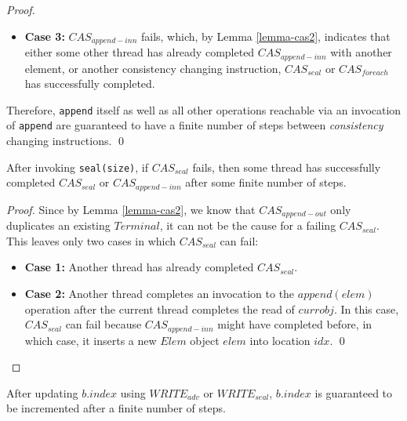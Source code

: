 \documentclass[runningheads,a4paper]{llncs}
\begin{document}
\begin{proof}
\begin{itemize}
\item \textbf{Case 3:} $CAS_{append-inn}$ fails, which, by Lemma 
\ref{lemma-cas2}, indicates that either some other thread has already completed 
$CAS_{append-inn}$ with another element, or another consistency changing
instruction, $CAS_{seal}$ or $CAS_{foreach}$ has successfully completed.

\end{itemize}

Therefore, \verb=append= itself as well as all other operations reachable via an
invocation of \verb=append= are guaranteed to have a finite number of steps between
\textit{consistency} changing instructions.
\qed
\end{proof}



\begin{lemma}\label{lemma-cas5}
After invoking \verb=seal(size)=, if $CAS_{seal}$ fails, then some thread has
successfully completed $CAS_{seal}$ or $CAS_{append-inn}$ after some finite number of steps.
\end{lemma}

\begin{proof} Since by Lemma \ref{lemma-cas2}, we know that $CAS_{append-out}$
only duplicates an existing $Terminal$, it can not be the cause for a failing
$CAS_{seal}$. This leaves only two cases in which $CAS_{seal}$ can fail:

\begin{itemize}
\item \textbf{Case 1:} Another thread has already completed $CAS_{seal}$.
\item \textbf{Case 2:} Another thread completes an invocation to the
$append(elem)$ operation after the current thread completes the read of
$currobj$. In this  case, $CAS_{seal}$ can fail because $CAS_{append-inn}$ 
might have  completed before, in which case, it inserts a new $Elem$ object 
$elem$  into location $idx$.
\qed
\end{itemize}
\end{proof}


\begin{lemma}\label{lemma-write2-write3}
After updating $b.index$ using $WRITE_{adv}$ or $WRITE_{seal}$,  $b.index$ is guaranteed
to be incremented after a finite number of steps.
\end{lemma}
\end{document}
